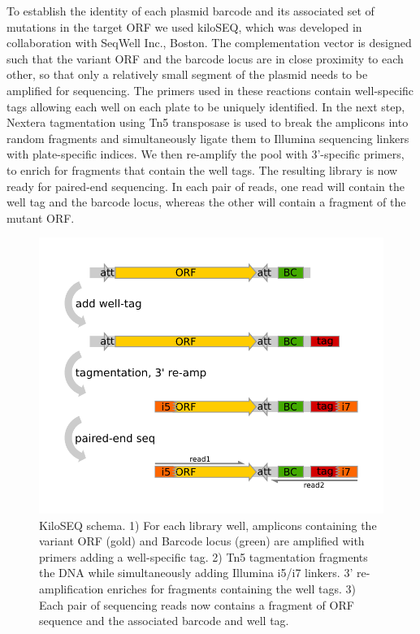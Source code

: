 To establish the identity of each plasmid barcode and its associated set of mutations in the target ORF we used kiloSEQ, which was developed in collaboration with SeqWell Inc., Boston. The complementation vector is designed such that the variant ORF and the barcode locus are in close proximity to each other, so that only a relatively small segment of the plasmid needs to be amplified for sequencing. The primers used in these reactions contain well-specific tags allowing each well on each plate to be uniquely identified. In the next step, Nextera tagmentation using Tn5 transposase is used to break the amplicons into random fragments and simultaneously ligate them to Illumina sequencing linkers with plate-specific indices. We then re-amplify the pool with  3'-specific primers, to enrich for fragments that contain the well tags. The resulting library is now ready for paired-end sequencing. In each pair of reads, one read will contain the well tag and the barcode locus, whereas the other will contain a fragment of the mutant ORF.

\begin{figure}[h!]
	\centering
	\includegraphics[width=.5\textwidth]{img/kiloseq_schema_new.pdf}
	\caption{KiloSEQ schema. 1) For each library well, amplicons containing the variant ORF (gold) and Barcode locus (green) are amplified with primers adding a well-specific tag. 2) Tn5 tagmentation fragments the DNA while simultaneously adding Illumina i5/i7 linkers. 3' re-amplification enriches for fragments containing the well tags. 3) Each pair of sequencing reads now contains a fragment of ORF sequence and the associated barcode and well tag.}
	\label{fig:kiloseq_schema}
\end{figure}

